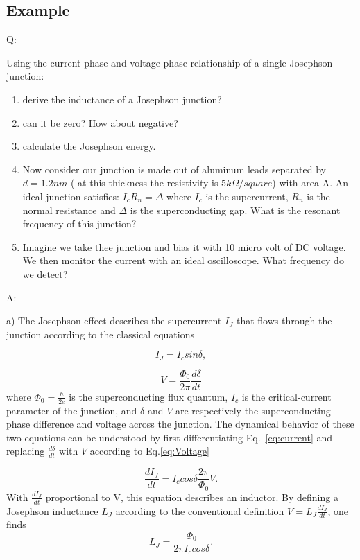 \documentclass[12pt]{article}
\begin{document}
\subsection*{Example}
Q:

 Using the current-phase and voltage-phase relationship of a single Josephson junction: 
\begin{enumerate}[label=(\alph*)]
    \item derive the inductance of a Josephson junction?
    \item can it be zero? How about negative?
    \item calculate the Josephson energy.
    \item Now consider our junction is made out of aluminum leads separated by $d = 1.2 nm$ ( at this thickness the resistivity is $5  k\Omega/ square$) with area A. An ideal junction satisfies: $I_c R_n = \Delta$ where $I_c$ is the supercurrent, $R_n$ is the normal resistance and $\Delta$ is the superconducting gap. What is the resonant frequency of this junction?
    \item Imagine we take thee junction and bias it with 10 micro volt of DC voltage. We then monitor the current with an ideal oscilloscope. What frequency do we detect?

\end{enumerate}


A:

a) 
The Josephson effect describes the supercurrent $I_J$ that flows through the junction according to the classical equations 


\begin{equation}
    I_J=I_csin\delta,
    \label{eq:current}
\end{equation}

\begin{equation}
    V=\frac{\Phi_0}{2\pi} \frac{d\delta}{dt}
    \label{eq:Voltage}
\end{equation}
where $\Phi_0 = \frac{h}{2e}$ is the superconducting flux quantum, $I_c$ is the critical-current parameter of the junction, and $\delta$ and $V$ are respectively the superconducting phase difference and voltage across the junction. The dynamical behavior of these two equations can be understood by first differentiating Eq.~\eqref{eq:current} and replacing $\frac{d\delta}{dt}$ with $V$ according to Eq.\eqref{eq:Voltage}

\begin{equation}
    \frac{dI_J}{dt} = I_ccos\delta\frac{2\pi}{\Phi_0}V.
\end{equation}
With $\frac{dI_J}{dt}$ proportional to V, this equation describes an inductor. By defining a Josephson inductance $L_J$ according to the conventional definition $V = L_J\frac{dI_J}{dt}$, one finds
\begin{equation}
    L_J = \frac{\Phi_0}{2\pi I_ccos\delta}.
    \label{eq:josephson-inductance}
\end{equation}
\end{document}
